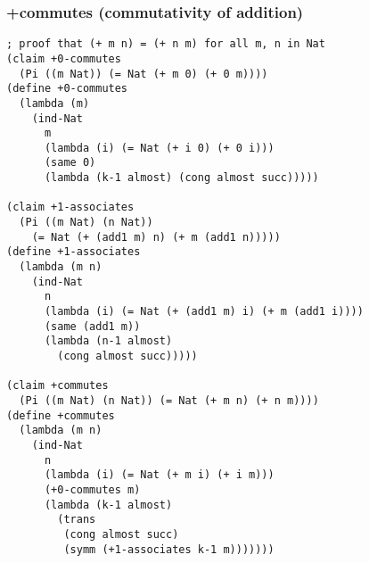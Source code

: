 \subsubsection{+commutes (commutativity of addition)} \label{code:+commutes}
\begin{verbatim}
; proof that (+ m n) = (+ n m) for all m, n in Nat
(claim +0-commutes
  (Pi ((m Nat)) (= Nat (+ m 0) (+ 0 m))))
(define +0-commutes
  (lambda (m)
    (ind-Nat
      m
      (lambda (i) (= Nat (+ i 0) (+ 0 i)))
      (same 0)
      (lambda (k-1 almost) (cong almost succ)))))

(claim +1-associates
  (Pi ((m Nat) (n Nat))
    (= Nat (+ (add1 m) n) (+ m (add1 n)))))
(define +1-associates
  (lambda (m n)
    (ind-Nat
      n
      (lambda (i) (= Nat (+ (add1 m) i) (+ m (add1 i))))
      (same (add1 m))
      (lambda (n-1 almost)
        (cong almost succ)))))

(claim +commutes
  (Pi ((m Nat) (n Nat)) (= Nat (+ m n) (+ n m))))
(define +commutes
  (lambda (m n)
    (ind-Nat
      n
      (lambda (i) (= Nat (+ m i) (+ i m)))
      (+0-commutes m)
      (lambda (k-1 almost)
        (trans
         (cong almost succ)
         (symm (+1-associates k-1 m)))))))
\end{verbatim}

